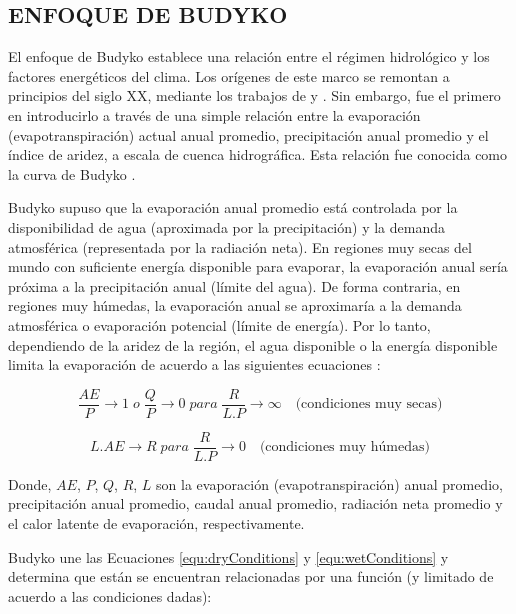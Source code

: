 \documentclass[12pt]{article}
\begin{document}
\subsection{ENFOQUE DE BUDYKO}

El enfoque de Budyko establece una relación entre el régimen hidrológico y los factores energéticos del clima. Los orígenes de este marco se remontan a principios del siglo XX, mediante los trabajos de \citet{schreiber1904relationship} y \citet{ol1911evaporation}. Sin embargo, \citet{budyko1958heat} fue el primero en introducirlo a través de una simple relación entre la evaporación (evapotranspiración) actual anual promedio, precipitación anual promedio y el índice de aridez, a escala de cuenca hidrográfica. Esta relación fue conocida como la curva de Budyko \citep{budyko1958heat}.

Budyko supuso que la evaporación anual promedio está controlada por la disponibilidad de agua (aproximada por la precipitación) y la demanda atmosférica (representada por la radiación neta). En regiones muy secas del mundo con suficiente energía disponible para evaporar, la evaporación anual sería próxima a la precipitación anual (límite del agua). De forma contraria, en regiones muy húmedas, la evaporación anual se aproximaría a la demanda atmosférica o evaporación potencial (límite de energía). Por lo tanto, dependiendo de la aridez de la región, el agua disponible o la energía disponible limita la evaporación de acuerdo a las siguientes ecuaciones \citep{budyko1958heat}:

\begin{equation}
 \frac{AE}{P} \rightarrow 1 \; o \; \frac{Q}{P} \rightarrow 0 \;para\; \frac{R}{L.P} \rightarrow \infty \quad \text{(condiciones muy secas)}
\label{equ:dryConditions}
\end{equation}

\begin{equation}
L.AE \rightarrow R \;para\; \frac{R}{L.P} \rightarrow 0 \quad \text{(condiciones muy húmedas)}
\label{equ:wetConditions}
\end{equation}

Donde, $AE$, $P$, $Q$, $R$, $L$ son la evaporación (evapotranspiración) anual promedio, precipitación anual promedio, caudal anual promedio, radiación neta promedio y el calor latente de evaporación, respectivamente.

\clearpage
Budyko une las Ecuaciones \ref{equ:dryConditions} y \ref{equ:wetConditions} y determina que están se encuentran relacionadas por una función (y limitado de acuerdo a las condiciones dadas):
\end{document}
